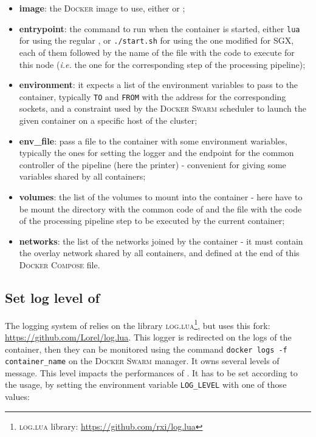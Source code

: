 \begin{itemize}
  \item \textbf{image}: the \textsc{Docker} image to use, either \dockerimagelua{} or \dockerimageluasgx{};
  \item \textbf{entrypoint}: the command to run when the container is started, either \texttt{lua} for using the regular \luavm{}, or \texttt{./start.sh} for using the one modified for SGX, each of them followed by the name of the file with the code to execute for this node (\textit{i.e.} the one for the corresponding step of the processing pipeline);
  \item \textbf{environment}: it expects a list of the environment variables to pass to the container, typically \texttt{TO} and \texttt{FROM} with the address for the corresponding sockets, and a constraint used by the \textsc{Docker Swarm} scheduler to launch the given container on a specific host of the cluster;
  \item \textbf{env\_file}: pass a file to the container with some environment wariables, typically the ones for setting the logger and the endpoint for the common controller of the pipeline (here the printer) - convenient for giving some variables shared by all containers;
  \item \textbf{volumes}: the list of the volumes to mount into the container - here have to be mount the directory with the common code of \SS{} and the file with the code of the processing pipeline step to be executed by the current container;
  \item \textbf{networks}: the list of the networks joined by the container - it must contain the overlay network shared by all containers, and defined at the end of this \textsc{Docker Compose} file.
\end{itemize}



\newpage

\subsection{Set log level of \SS{}}
\label{subsec:ss-log-level}

The logging system of \SS{} relies on the library \textsc{log.lua}\footnote{\textsc{log.lua} library: \url{https://github.com/rxi/log.lua}}, but uses this fork: \url{https://github.com/Lorel/log.lua}.
This logger is redirected on the logs of the container, then they can be monitored using the command \texttt{docker logs -f container\_name} on the \textsc{Docker Swarm} manager.
It owns several levels of message.
This level impacts the performances of \SS{}.
It has to be set according to the usage, by setting the environment variable \texttt{LOG\_LEVEL} with one of those values:

